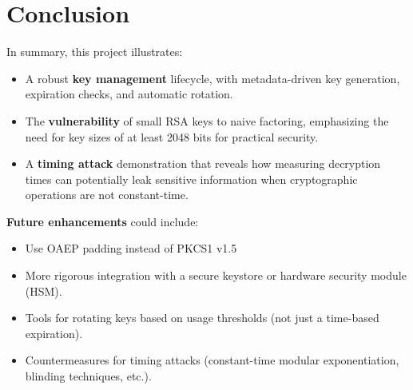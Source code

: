 \documentclass[12pt]{article}
\begin{document}
\section{Conclusion}

In summary, this project illustrates:
\begin{itemize}
    \item A robust \textbf{key management} lifecycle, with metadata-driven key generation, expiration checks, and automatic rotation.
    \item The \textbf{vulnerability} of small RSA keys to naive factoring, emphasizing the need for key sizes of at least 2048 bits for practical security.
    \item A \textbf{timing attack} demonstration that reveals how measuring decryption times can potentially leak sensitive information when cryptographic operations are not constant-time.
\end{itemize}

\noindent
\textbf{Future enhancements} could include:
\begin{itemize}
    \item Use OAEP padding instead of PKCS1 v1.5
    \item More rigorous integration with a secure keystore or hardware security module (HSM).
    \item Tools for rotating keys based on usage thresholds (not just a time-based expiration).
    \item Countermeasures for timing attacks (constant-time modular exponentiation, blinding techniques, etc.).
\end{itemize}
\end{document}
